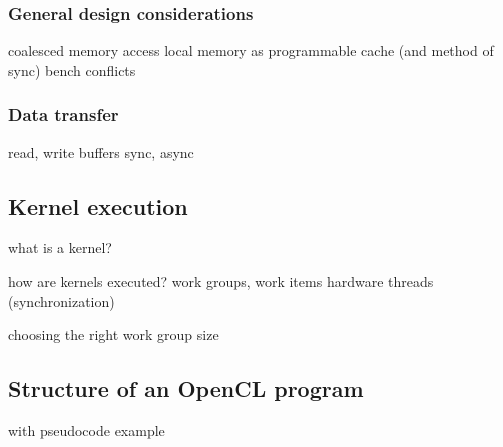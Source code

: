 \subsubsection{General design considerations}
coalesced memory access
local memory as programmable cache (and method of sync)
bench conflicts

\subsubsection{Data transfer}
read, write buffers
sync, async

\subsection{Kernel execution}
what is a kernel?

how are kernels executed?
work groups, work items
hardware threads (synchronization)

choosing the right work group size

\subsection{Structure of an OpenCL program}

with pseudocode example

